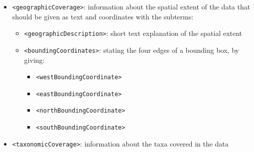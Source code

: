 \documentclass[
]{book}
\providecommand{\tightlist}{%
  \setlength{\itemsep}{0pt}\setlength{\parskip}{0pt}}
\begin{document}
\begin{itemize}
\begin{itemize}
\begin{itemize}
      \begin{itemize}
      \tightlist
      \item
        \texttt{\textless{}calendarDate\textgreater{}}
      \item
        \texttt{\textless{}time\textgreater{}}
      \item
        \texttt{\textless{}alternativeTimeScale\textgreater{}}: can describe alternative time scale, e.g., geological date, with a range of subterms
      \end{itemize}
    \item
      \texttt{\textless{}rangeOfDates\textgreater{}}: allows to describe a time range by specifying start and end date (with the same subterms as for singleDateTime). Can be repeated if there are several time ranges that need to be described.

      \begin{itemize}
      \tightlist
      \item
        \texttt{\textless{}beginDate\textgreater{}}
      \item
        \texttt{\textless{}endDate\textgreater{}}
      \end{itemize}
    \end{itemize}
  \item
    {\texttt{\textless{}geographicCoverage\textgreater{}}}: information about the spatial extent of the data that should be given as text and coordinates with the subterms:

    \begin{itemize}
    \tightlist
    \item
      \texttt{\textless{}geographicDescription\textgreater{}}: short text explanation of the spatial extent
    \item
      \texttt{\textless{}boundingCoordinates\textgreater{}}: stating the four edges of a bounding box, by giving:

      \begin{itemize}
      \tightlist
      \item
        \texttt{\textless{}westBoundingCoordinate\textgreater{}}
      \item
        \texttt{\textless{}eastBoundingCoordinate\textgreater{}}
      \item
        \texttt{\textless{}northBoundingCoordinate\textgreater{}}
      \item
        \texttt{\textless{}southBoundingCoordinate\textgreater{}}
      \end{itemize}
    \end{itemize}
  \item
    {\texttt{\textless{}taxonomicCoverage\textgreater{}}}: information about the taxa covered in the data


\end{itemize}
\end{itemize}
\end{document}
